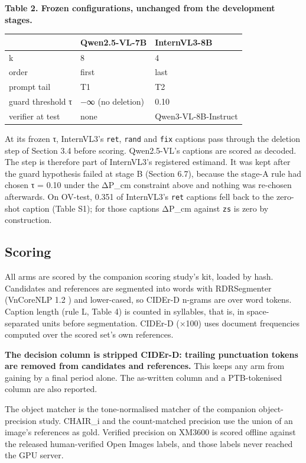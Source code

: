 \documentclass[manuscript,screen]{acmart}
\begin{document}
\textbf{Table 2. Frozen configurations, unchanged from the development stages.}

\begin{longtable}[]{@{}lll@{}}
\toprule\noalign{}
& Qwen2.5-VL-7B & InternVL3-8B \\
\midrule\noalign{}
\endhead
\bottomrule\noalign{}
\endlastfoot
k & 8 & 4 \\
order & first & last \\
prompt tail & T1 & T2 \\
guard threshold τ & −∞ (no deletion) & 0.10 \\
verifier at test & none & Qwen3-VL-8B-Instruct \\
\end{longtable}

At its frozen τ, InternVL3's \texttt{ret}, \texttt{rand} and \texttt{fix} captions pass through the
deletion step of Section 3.4 before scoring. Qwen2.5-VL's captions are scored as decoded. The step
is therefore part of InternVL3's registered estimand. It was kept after the guard hypothesis failed
at stage B (Section 6.7), because the stage-A rule had chosen τ = 0.10 under the ΔP\_cm constraint
above and nothing was re-chosen afterwards. On OV-test, 0.351 of InternVL3's \texttt{ret} captions
fell back to the zero-shot caption (Table S1); for those captions ΔP\_cm against \texttt{zs} is zero
by construction.

\subsection{Scoring}\label{scoring}

All arms are scored by the companion scoring study's kit, loaded by hash. Candidates and references
are segmented into words with RDRSegmenter \citep{Nguyen2018VnCoreNLP} (VnCoreNLP 1.2
\citep{Vu2018VnCoreNLP}) and lower-cased, so CIDEr-D n-grams are over word tokens. Caption length
(rule L, Table 4) is counted in syllables, that is, in space-separated units before segmentation.
CIDEr-D (×100) uses document frequencies computed over the scored set's own references.

\textbf{The decision column is stripped CIDEr-D: trailing punctuation tokens are removed from
candidates and references.} This keeps any arm from gaining by a final period alone. The as-written
column and a PTB-tokenised column are also reported.

The object matcher is the tone-normalised matcher of the companion object-precision study. CHAIR\_i
and the count-matched precision use the union of an image's references as gold. Verified precision
on XM3600 is scored offline against the released human-verified Open Images labels, and those labels
never reached the GPU server.
\end{document}
